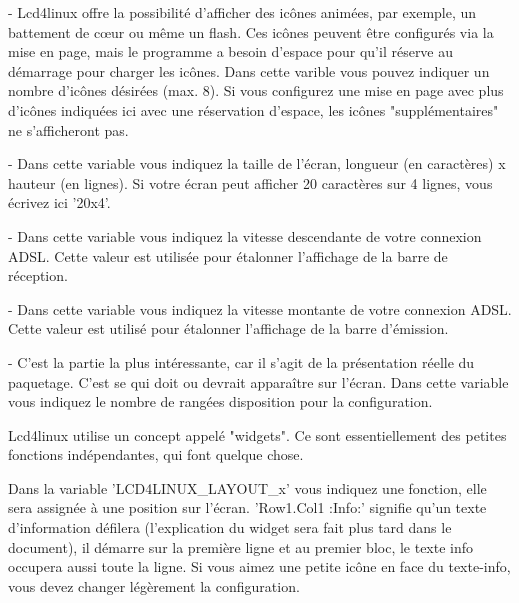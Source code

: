 \begin{description}
  - Lcd4linux offre la possibilité d'afficher des icônes animées, par exemple,
  un battement de c\oe{}ur ou même un flash. Ces icônes peuvent être configurés via
  la mise en page, mais le programme a besoin d'espace pour qu'il réserve au
  démarrage pour charger les icônes. Dans cette varible vous pouvez indiquer un
  nombre d'icônes désirées (max. 8). Si vous configurez une mise en page avec
  plus d'icônes indiquées ici avec une réservation d'espace, les icônes
  "supplémentaires" ne s'afficheront pas.

  - Dans cette variable vous indiquez la taille de l'écran, longueur (en caractères)
  x hauteur (en lignes). Si votre écran peut afficher 20 caractères sur 4 lignes, vous
  écrivez ici '20x4'.

  - Dans cette variable vous indiquez la vitesse descendante de votre connexion
  ADSL. Cette valeur est utilisée pour étalonner l'affichage de la barre de réception.

  - Dans cette variable vous indiquez la vitesse montante de votre connexion ADSL.
  Cette valeur est utilisé pour étalonner l'affichage de la barre d'émission.

  - C'est la partie la plus intéressante, car il s'agit de la présentation réelle
  du paquetage. C'est se qui doit ou devrait apparaître sur l'écran. Dans cette
  variable vous indiquez le nombre de rangées disposition pour la configuration.

  Lcd4linux utilise un concept appelé "widgets". Ce sont essentiellement des petites
  fonctions indépendantes, qui font quelque chose.

  Dans la variable 'LCD4LINUX\_LAYOUT\_x' vous indiquez une fonction, elle sera assignée
  à une position sur l'écran. 'Row1.Col1  :Info:' signifie qu'un texte d'information défilera
  (l'explication du widget sera fait plus tard dans le document), il démarre sur la première
  ligne et au premier bloc, le texte info occupera aussi toute la ligne. Si vous aimez une
  petite icône en face du texte-info, vous devez changer légèrement la configuration.


\end{description}
